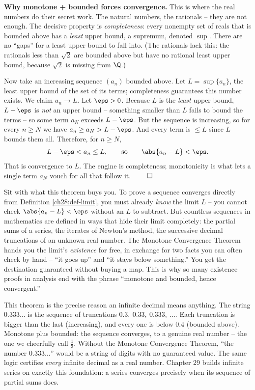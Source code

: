 \begin{whybox}
\textbf{Why monotone + bounded forces convergence.} This is where the real
numbers do their secret work. The natural numbers, the rationals -- they are not
enough. The decisive property is \emph{completeness}: every nonempty set of reals
that is bounded above has a \emph{least} upper bound, a supremum, denoted $\sup$.
There are no ``gaps'' for a least upper bound to fall into. (The rationals lack
this: the rationals less than $\sqrt2$ are bounded above but have no rational
least upper bound, because $\sqrt2$ is missing from $\Q$.)

Now take an increasing sequence $(a_n)$ bounded above. Let $L = \sup\{a_n\}$, the
least upper bound of the set of its terms; completeness guarantees this number
exists. We claim $a_n \to L$. Let $\eps > 0$. Because $L$ is the \emph{least}
upper bound, $L - \eps$ is \emph{not} an upper bound -- something smaller than $L$
fails to bound the terms -- so some term $a_N$ exceeds $L - \eps$. But the
sequence is increasing, so for every $n \ge N$ we have $a_n \ge a_N > L - \eps$.
And every term is $\le L$ since $L$ bounds them all. Therefore, for $n \ge N$,
\[
  L - \eps < a_n \le L,
  \qquad\text{so}\qquad
  \abs{a_n - L} < \eps .
\]
That is convergence to $L$. The engine is completeness; monotonicity is what lets
a single term $a_N$ vouch for all that follow it. $\qed$
\end{whybox}

\begin{aestheticbox}
Sit with what this theorem buys you. To prove a sequence converges directly from
Definition \ref{ch28:def-limit}, you must already \emph{know} the limit $L$ --
you cannot check $\abs{a_n - L} < \eps$ without an $L$ to subtract. But countless
sequences in mathematics are defined in ways that hide their limit completely:
the partial sums of a series, the iterates of Newton's method, the successive
decimal truncations of an unknown real number. The Monotone Convergence Theorem
hands you the limit's \emph{existence} for free, in exchange for two facts you
can often check by hand -- ``it goes up'' and ``it stays below something.'' You
get the destination guaranteed without buying a map. This is why so many
existence proofs in analysis end with the phrase ``monotone and bounded, hence
convergent.''
\end{aestheticbox}

\begin{connectionbox}
This theorem is the precise reason an infinite decimal means anything. The string
$0.333\ldots$ is the sequence of truncations $0.3,\ 0.33,\ 0.333,\ \dots$. Each
truncation is bigger than the last (increasing), and every one is below $0.4$
(bounded above). Monotone plus bounded: the sequence converges, to a genuine real
number -- the one we cheerfully call $\tfrac13$. Without the Monotone Convergence
Theorem, ``the number $0.333\ldots$'' would be a string of digits with no
guaranteed value. The same logic certifies \emph{every} infinite decimal as a
real number. Chapter 29 builds infinite series on exactly this foundation:
a series converges precisely when its sequence of partial sums does.
\end{connectionbox}

